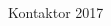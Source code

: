 \documentclass[../_main/handlingar.tex]{subfiles}
\begin{document}


\begin{signatures}{1}
    \mvh
    \signature{Johan Karlberg}{Kontaktor 2017}
\end{signatures}
\end{document}
